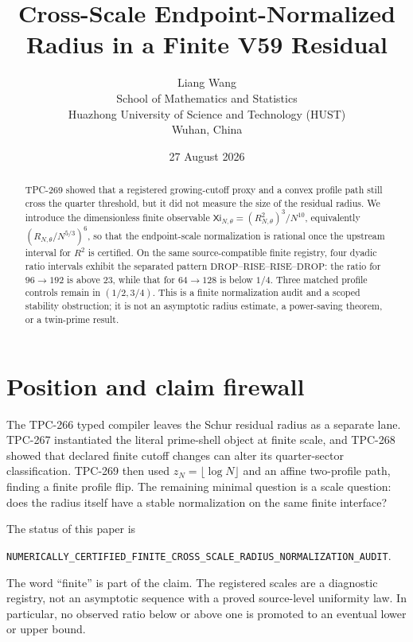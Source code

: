 \documentclass[11pt]{article}
\title{Cross-Scale Endpoint-Normalized Radius in a Finite V59 Residual}
\author{Liang Wang\\School of Mathematics and Statistics\\Huazhong University of Science and Technology (HUST)\\Wuhan, China}
\date{27 August 2026}
\newcommand{\XiN}{\mathsf{Xi}}
\begin{document}
\maketitle
\begin{abstract}
TPC-269 showed that a registered growing-cutoff proxy and a convex profile path
still cross the quarter threshold, but it did not measure the size of the
residual radius. We introduce the dimensionless finite observable
\(\XiN_{N,\theta}=(R_{N,\theta}^{2})^3/N^{10}\), equivalently
\((R_{N,\theta}/N^{5/3})^6\), so that the endpoint-scale normalization is
rational once the upstream interval for \(R^2\) is certified. On the same
source-compatible finite registry, four dyadic ratio intervals exhibit the
separated pattern \(\text{DROP--RISE--RISE--DROP}\): the ratio for
\(96\!\to\!192\) is above \(23\), while that for \(64\!\to\!128\) is below
\(1/4\). Three matched profile controls remain in \((1/2,3/4)\). This is a
finite normalization audit and a scoped stability obstruction; it is not an
asymptotic radius estimate, a power-saving theorem, or a twin-prime result.
\end{abstract}

\section{Position and claim firewall}
The TPC-266 typed compiler leaves the Schur residual radius as a separate lane.
TPC-267 instantiated the literal prime-shell object at finite scale, and
TPC-268 showed that declared finite cutoff changes can alter its quarter-sector
classification. TPC-269 then used \(z_N=\lfloor\log N\rfloor\) and an affine
two-profile path, finding a finite profile flip. The remaining minimal question
is a scale question: does the radius itself have a stable normalization on the
same finite interface?

The status of this paper is
\begin{center}
\texttt{NUMERICALLY\_CERTIFIED\_FINITE\_CROSS\_SCALE\_RADIUS\_NORMALIZATION\_AUDIT}.
\end{center}
The word ``finite'' is part of the claim. The registered scales are a diagnostic
registry, not an asymptotic sequence with a proved source-level uniformity law.
In particular, no observed ratio below or above one is promoted to an eventual
lower or upper bound.
\end{document}
